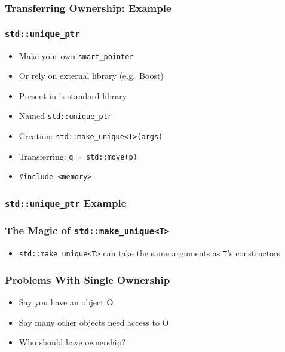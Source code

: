 \documentclass{../ucll-slides}
\begin{document}
\begin{frame}
  \frametitle{Transferring Ownership: Example}
\end{frame}

\begin{frame}
  \frametitle{\tt std::unique\_ptr}
  \begin{itemize}
    \item Make your own {\tt smart\_pointer}
    \item Or rely on external library (e.g.~Boost)
  \end{itemize}
  \vskip5mm
  \begin{itemize}
    \item Present in \cpp's standard library
    \item Named {\tt std::unique\_ptr}
    \item Creation: {\tt std::make\_unique<T>(args)}
    \item Transferring: {\tt q = std::move(p)}
    \item {\tt \#include <memory>}
  \end{itemize}
\end{frame}

\begin{frame}
  \frametitle{{\tt std::unique\_ptr} Example}
\end{frame}

\begin{frame}
  \frametitle{The Magic of {\tt std::make\_unique<T>}}
  \begin{itemize}
    \item {\tt std::make\_unique<T>} can take the same arguments as {\tt T}'s constructors
  \end{itemize}
\end{frame}

\begin{frame}
  \frametitle{Problems With Single Ownership}
  \begin{itemize}
    \item Say you have an object O
    \item Say many other objects need access to O
    \item Who should have ownership?
  \end{itemize}
  \begin{center}
  \end{center}
\end{frame}
\end{document}
